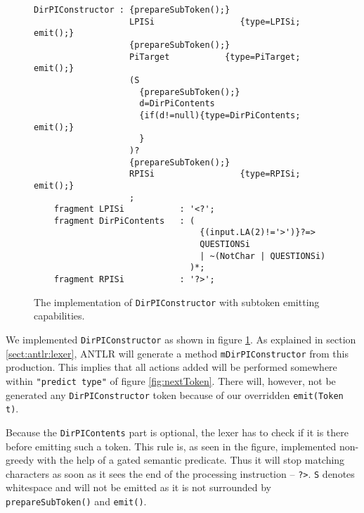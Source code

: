 \begin{figure}[h!]
\begin{Verbatim}
DirPIConstructor : {prepareSubToken();}
                   LPISi                 {type=LPISi; emit();}
                   {prepareSubToken();}
                   PiTarget           {type=PiTarget; emit();}
                   (S
                     {prepareSubToken();}
                     d=DirPiContents
                     {if(d!=null){type=DirPiContents; emit();} 
                     } 
                   )?
                   {prepareSubToken();}
                   RPISi                 {type=RPISi; emit();}
                   ;
    fragment LPISi           : '<?';
    fragment DirPiContents   : (
                                 {(input.LA(2)!='>')}?=>
                                 QUESTIONSi 
                                 | ~(NotChar | QUESTIONSi)
                               )*;
    fragment RPISi           : '?>';
\end{Verbatim}
\caption[\texttt{DirPIConstructor} emitting subtokens]{The implementation of \texttt{DirPIConstructor} with subtoken emitting capabilities.}
\label{fig:pragmaLEX}
\end{figure}

We implemented \verb!DirPIConstructor! as shown in figure \ref{fig:pragmaLEX}. As explained in section \ref{sect:antlr:lexer}, ANTLR will generate a method \verb!mDirPIConstructor! from this production. This implies that all actions added will be performed somewhere within \verb!"predict type"! of figure \ref{fig:nextToken}. There will, however, not be generated any \verb!DirPIConstructor! token because of our overridden \verb!emit(Token t)!.

Because the \verb!DirPIContents! part is optional, the lexer has to check if it is there before emitting such a token. This rule is, as seen in the figure, implemented non-greedy with the help of a gated semantic predicate. Thus it will stop matching characters as soon as it sees the end of the processing instruction -- \verb!?>!. \verb!S! denotes whitespace and will not be emitted as it is not surrounded by \verb!prepareSubToken()! and \verb!emit()!.

